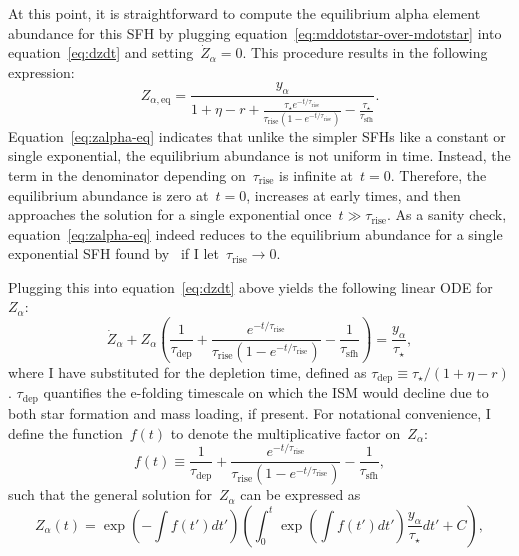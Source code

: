 \documentclass[12pt]{article}
\newcommand{\ddfrac}[2]{\frac{\displaystyle{#1}}{\displaystyle{#2}}}
\newcommand{\timescale}[1]{\ensuremath{\tau_\text{#1}}}
\begin{document}
At this point, it is straightforward to compute the equilibrium alpha element
abundance for this SFH by plugging equation~\ref{eq:mddotstar-over-mdotstar}
into equation~\ref{eq:dzdt} and setting~$\dot{Z}_\alpha = 0$.
This procedure results in the following expression:
\begin{equation}
Z_{\alpha,\text{eq}} = \ddfrac{
	y_\alpha
}{
	1 + \eta - r + \frac{
		\tau_\star e^{-t / \timescale{rise}}
	}{
		\timescale{rise}(1 - e^{-t / \timescale{rise}})
	} - \frac{\tau_\star}{\timescale{sfh}}
}.
\label{eq:zalpha-eq}
\end{equation}
Equation~\ref{eq:zalpha-eq} indicates that unlike the simpler SFHs like a
constant or single exponential, the equilibrium abundance is not uniform in
time.
Instead, the term in the denominator depending on~\timescale{rise} is infinite
at~$t = 0$.
Therefore, the equilibrium abundance is zero at~$t = 0$, increases at early
times, and then approaches the solution for a single exponential
once~$t \gg \timescale{rise}$.
As a sanity check, equation~\ref{eq:zalpha-eq} indeed reduces to the
equilibrium abundance for a single exponential SFH found
by~\citet*{Weinberg2017} if I let~$\timescale{rise} \rightarrow 0$.
\par
Plugging this into equation~\ref{eq:dzdt} above yields the following linear
ODE for~$Z_\alpha$:
\begin{equation}
\dot{Z}_\alpha + Z_\alpha \left(\frac{1}{\timescale{dep}} +
\frac{
	e^{-t / \timescale{rise}}
}{
	\timescale{rise}(1 - e^{-t / \timescale{rise}})
} - \frac{1}{\timescale{sfh}}\right) = \frac{y_\alpha}{\tau_\star},
\end{equation}
where I have substituted for the depletion time, defined as
$\timescale{dep} \equiv \tau_\star / (1 + \eta - r)$.
$\timescale{dep}$ quantifies the e-folding timescale on which the ISM would
decline due to both star formation and mass loading, if present.
For notational convenience, I define the function~$f(t)$ to denote the
multiplicative factor on~$Z_\alpha$:
\begin{equation}
f(t) \equiv \frac{1}{\timescale{dep}} + \frac{
	e^{-t / \timescale{rise}}
}{
	\timescale{rise}(1 - e^{-t / \timescale{rise}})
} - \frac{1}{\timescale{sfh}},
\end{equation}
such that the general solution for~$Z_\alpha$ can be expressed as
\begin{equation}
Z_\alpha(t) = \exp\left(-\int f(t') dt'\right)\left(
\int_0^t \exp\left(\int f(t') dt'\right) \frac{y_\alpha}{\tau_\star} dt' + C
\right),
\label{eq:za-linear-ode}
\end{equation}
\end{document}
